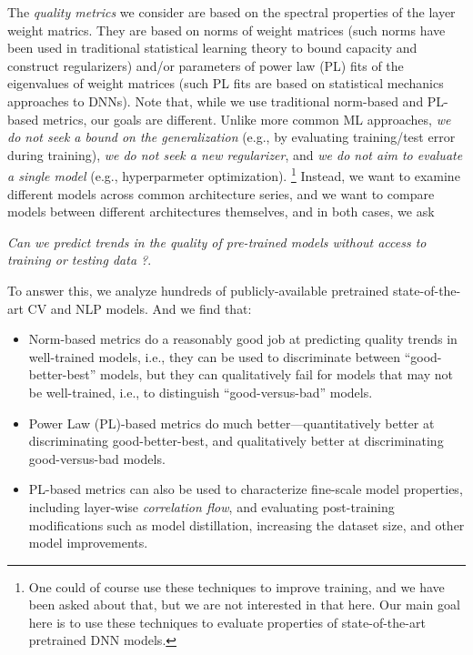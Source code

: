 The \emph{quality metrics} we consider are based on the spectral properties of the layer weight matrics.
They are based on norms of weight matrices (such norms have been used in traditional statistical learning theory to bound capacity and construct regularizers) and/or parameters of power law (PL) fits of the eigenvalues of weight matrices (such PL fits are based on statistical mechanics approaches to DNNs).
Note that, while we use traditional norm-based and PL-based metrics, our goals are different.
Unlike more common ML approaches, \emph{we do not seek a bound on the generalization} (e.g., by evaluating training/test error during training), \emph{we do not seek a new regularizer}, and \emph{we do not aim to evaluate a single model} (e.g., hyperparmeter optimization).%
\footnote{One could of course use these techniques to improve training, and we have been asked about that, but we are not interested in that here. Our main goal here is to use these techniques to evaluate properties of state-of-the-art pretrained DNN models.}
Instead, we want to examine different models across common architecture series, and we want to compare models between different architectures themselves, and in both cases, we ask

\emph{Can we predict trends in the quality of pre-trained models without access to training or testing data ?}.  


To answer this, we analyze hundreds of publicly-available pretrained state-of-the-art CV and NLP models. And we find that:
\begin{itemize}
\item
Norm-based metrics do a reasonably good job at predicting quality trends in well-trained models, i.e., they can be used to discriminate between ``good-better-best'' models, but they can qualitatively fail for models that may not be well-trained, i.e., to distinguish ``good-versus-bad'' models.
\item 
Power Law (PL)-based metrics do much better---quantitatively better at discriminating good-better-best, and qualitatively better at discriminating good-versus-bad models.
\item 
PL-based metrics can also be used to characterize fine-scale model properties, including layer-wise \emph{correlation flow}, and evaluating post-training modifications such as model distillation, increasing the dataset size, and other model improvements.
\end{itemize}

